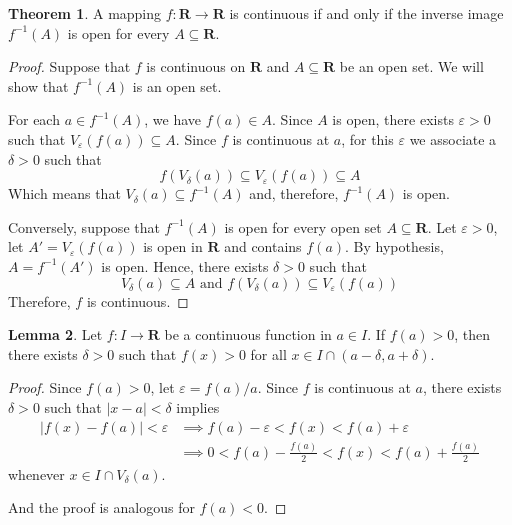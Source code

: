 \documentclass[tikz,12pt,a4paper]{article}
\theoremstyle{definition}
\newtheorem{theorem}{Theorem}[section]
\newtheorem{lemma}[theorem]{Lemma}
\begin{document}
\begin{theorem}
	A mapping $f : \textbf{R} \longrightarrow \textbf{R}$ is continuous if and only if the inverse image $f^{-1}(A)$ is open for every $A \subseteq \textbf{R}$.
\end{theorem}

\begin{proof}
	Suppose that $f$ is continuous on $\textbf{R}$ and $A \subseteq \textbf{R}$ be an open set. We will show that $f^{-1}(A)$ is an open set. 
	
	For each $a \in f^{-1}(A)$, we have $f(a) \in A$. Since $A$ is open, there exists $\varepsilon > 0$ such that $V_{\varepsilon}(f(a)) \subseteq A$. Since $f$ is continuous at $a$, for this $\varepsilon$ we associate a $\delta > 0$ such that
	\[
		f(V_{\delta}(a)) \subseteq V_{\varepsilon}(f(a)) \subseteq A
	\]
	Which means that $V_{\delta}(a) \subseteq f^{-1}(A)$ and, therefore, $f^{-1}(A)$ is open.
	
	Conversely, suppose that $f^{-1}(A)$ is open for every open set $A \subseteq \textbf{R}$. Let $\varepsilon > 0$, let $A' = V_{\varepsilon}(f(a))$ is open in $\textbf{R}$ and contains $f(a)$. By hypothesis, $A = f^{-1}(A')$ is open. Hence, there exists $\delta > 0$ such that
	\[
		V_{\delta}(a) \subseteq A \text{ and } f(V_{\delta}(a)) \subseteq V_{\varepsilon}(f(a))
	\]
	Therefore, $f$ is continuous.
\end{proof}

\begin{lemma}
	Let $f : I \longrightarrow \textbf{R}$ be a continuous function in $a \in I$. If $f(a) > 0$, then there exists $\delta > 0$ such that $f(x) > 0$ for all $x \in I \cap (a-\delta, a+ \delta)$.
\end{lemma}

\begin{proof}
	Since $f(a) > 0$, let $\varepsilon = f(a) / a$. Since $f$ is continuous at $a$, there exists $\delta > 0$ such that $|x-a| < \delta$ implies
	\begin{equation*}
		\begin{aligned}
			|f(x) - f(a)| < \varepsilon & \implies f(a) - \varepsilon < f(x) < f(a) + \varepsilon \\
			& \implies 0 < f(a) - \frac{f(a)}{2} < f(x) < f(a) + \frac{f(a)}{2}
		\end{aligned}
	\end{equation*}
	whenever $x \in I \cap V_{\delta}(a)$.
	
	And the proof is analogous for $f(a) < 0$.
\end{proof}
\end{document}
